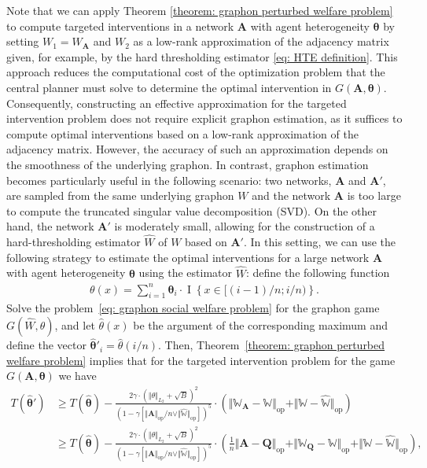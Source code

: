 \documentclass[11pt]{article}
\newcommand{\op}{\mathrm{op}}
\newcommand{\bA}{\bm{A}}
\newcommand{\bQ}{\bm{Q}}
\newcommand{\btheta}{\bm{\theta}}
\newcommand{\bbW}{\mathbb{W}}
\newcommand{\indicator}[1]{{\operatorname{I} \left \{ #1\right \}}}
\newcommand{\<}{\langle}
\renewcommand{\>}{\rangle}
\theoremstyle{plain}
\theoremstyle{definition}
\theoremstyle{remark}
\begin{document}
Note that   we can apply Theorem \ref{theorem: graphon perturbed welfare problem} to compute targeted interventions in a network \(\bA\) with agent heterogeneity \(\btheta\) by setting \(W_1 = W_{\bA}\) and \(W_2\) as a low-rank approximation of the adjacency matrix given, for example, by the hard thresholding estimator \eqref{eq: HTE definition}. This approach reduces the computational cost of the optimization problem that the central planner must solve to determine the optimal intervention in \(G(\bA, \btheta)\). Consequently, constructing an effective approximation for the targeted intervention problem does not require explicit graphon estimation, as it suffices to compute optimal interventions based on a low-rank approximation of the adjacency matrix. However, the accuracy of such an approximation depends on the smoothness of the underlying graphon.
 In contrast, graphon estimation becomes particularly useful in the following scenario:  
  two networks, \( \mathbf{A} \) and \( \mathbf{A}' \), are sampled from the same underlying graphon \( W \) and  the network \( \mathbf{A} \) is too large to compute the truncated singular value decomposition (SVD).  
 On the other hand, the network \( \mathbf{A}' \) is moderately small, allowing for the construction of a hard-thresholding estimator \( \widehat{W} \) of \( W \) based on \( \mathbf{A}' \).  
 In this setting, we can use the following strategy to estimate the optimal interventions for a large network \( \mathbf{A} \) with agent heterogeneity \( \boldsymbol{\theta} \) using the estimator \( \widehat{W} \): 
define the following  function 
\begin{align*}
     \theta(x) = \sum_{i = 1}^n \btheta_i \cdot \indicator{x \in [(i - 1)/n; i/n)}.
\end{align*}
Solve the problem~\eqref{eq: graphon social welfare problem} for the graphon game $G(\widehat{W},  \theta)$, and let $\widehat \theta(x)$ be the argument of the corresponding maximum and define the vector $\widehat{\btheta}'_i = \widehat \theta(i/n)$.
Then, Theorem~\ref{theorem: graphon perturbed welfare problem} implies that for the targeted intervention problem for the game $G(\bA, \btheta)$ we have
\begin{align*}
    T(\widehat{\btheta}') & \ge T(\widehat{\btheta}) - \frac{ 2 \gamma \cdot (\Vert \theta \Vert_{L_2} + \sqrt{B})^2 }{(1 - \gamma [\Vert \bA \Vert_{\op} / n \vee \Vert \widehat{\bbW} \Vert_{\op}])^5} \cdot (\Vert \bbW_{\bA} - \bbW \Vert_{\op} + \Vert \bbW - \widehat{\bbW} \Vert_{\op}) \\
    & \ge T(\widehat{\btheta}) - \frac{ 2 \gamma \cdot (\Vert \theta \Vert_{L_2} + \sqrt{B})^2 }{(1 - \gamma [\Vert \bA \Vert_{\op} / n \vee \Vert \widehat{\bbW} \Vert_{\op}])^5} \cdot \left (\frac{1}{n} \Vert \bA - \bQ \Vert_{\op} + \Vert \bbW_{\bQ} - \bbW \Vert_{\op} + \Vert \bbW - \widehat{\bbW} \Vert_{\op} \right ),
\end{align*}
\end{document}
